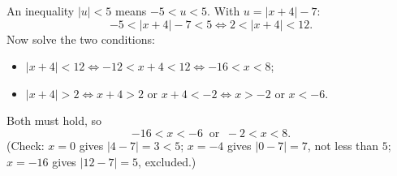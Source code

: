 An inequality $|u|<5$ means $-5<u<5$. With $u=|x+4|-7$:
\[
-5<|x+4|-7<5\iff 2<|x+4|<12 .
\]
Now solve the two conditions:
\begin{itemize}
\item $|x+4|<12\iff-12<x+4<12\iff-16<x<8$;
\item $|x+4|>2\iff x+4>2$ or $x+4<-2\iff x>-2$ or $x<-6$.
\end{itemize}
Both must hold, so
\[
\boxed{-16<x<-6\ \text{ or }\ -2<x<8}.
\]
(Check: $x=0$ gives $|4-7|=3<5$; $x=-4$ gives $|0-7|=7$, not less than $5$; $x=-16$ gives $|12-7|=5$, excluded.)
